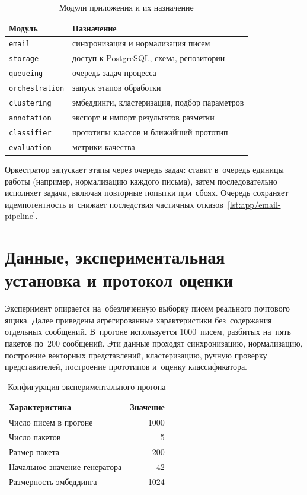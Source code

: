 \begin{table}[htbp]
    \centering
    \caption{Модули приложения и их назначение}\label{tab:ch3/modules}
    \begin{tabular}{@{}ll@{}}
        \toprule
        Модуль & Назначение \\
        \midrule
        \texttt{email}         & синхронизация и нормализация писем \\
        \texttt{storage}       & доступ к PostgreSQL, схема, репозитории \\
        \texttt{queueing}      & очередь задач процесса \\
        \texttt{orchestration} & запуск этапов обработки \\
        \texttt{clustering}    & эмбеддинги, кластеризация, подбор параметров \\
        \texttt{annotation}    & экспорт и импорт результатов разметки \\
        \texttt{classifier}    & прототипы классов и ближайший прототип \\
        \texttt{evaluation}    & метрики качества \\
        \bottomrule
    \end{tabular}
\end{table}
\FloatBarrier

Оркестратор запускает этапы через очередь задач: ставит в~очередь единицы работы
(например, нормализацию каждого письма), затем последовательно исполняет задачи,
включая повторные попытки при~сбоях. Очередь сохраняет идемпотентность и~снижает
последствия частичных отказов~\ref{lst:app/email-pipeline}.

\section{Данные, экспериментальная установка и протокол оценки}\label{sec:ch3/setup}

Эксперимент опирается на~обезличенную выборку писем реального почтового ящика.
Далее приведены агрегированные характеристики без~содержания отдельных сообщений.
В~прогоне используется 1000~писем, разбитых на~пять пакетов по~200 сообщений.
Эти данные проходят синхронизацию, нормализацию, построение векторных представлений,
кластеризацию, ручную проверку представителей, построение прототипов и~оценку классификатора.

\begin{table}[htbp]
    \centering
    \caption{Конфигурация экспериментального прогона}\label{tab:ch3/corpus}
    \begin{tabular}{@{}lr@{}}
        \toprule
        Характеристика & Значение \\
        \midrule
        Число писем в прогоне & 1000 \\
        Число пакетов & 5 \\
        Размер пакета & 200 \\
        Начальное значение генератора & 42 \\
        Размерность эмбеддинга & 1024 \\
        \bottomrule
    \end{tabular}
\end{table}
\FloatBarrier

